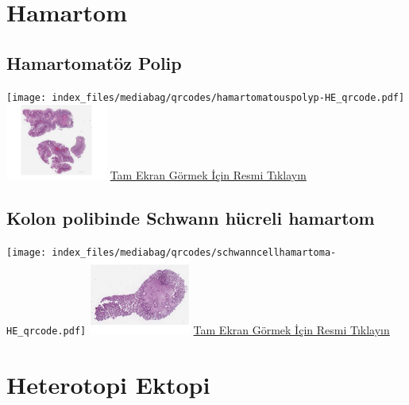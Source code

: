 \documentclass[
  letterpaper,
  DIV=11,
  numbers=noendperiod]{scrreprt}
\begin{document}
\hypertarget{section-11}{%
\chapter{}\label{section-11}}

\hypertarget{sec-hamartom}{%
\chapter{Hamartom}\label{sec-hamartom}}

\hypertarget{sec-hamartomatoz-polip}{%
\section{Hamartomatöz Polip}\label{sec-hamartomatoz-polip}}

\texttt{[image: index\_files/mediabag/qrcodes/hamartomatouspolyp-HE\_qrcode.pdf]}
\href{https://images.patolojiatlasi.com/hamartomatouspolyp/HE.html}{\includegraphics[width=0.25\textwidth,height=\textheight]{./screenshots/thumbnail_hamartomatouspolyp.png}}
\href{https://images.patolojiatlasi.com/hamartomatouspolyp/HE.html}{Tam
Ekran Görmek İçin Resmi Tıklayın}

\hypertarget{sec-schwann-hucreli-hamartom-kolon-polibi}{%
\section{Kolon polibinde Schwann hücreli
hamartom}\label{sec-schwann-hucreli-hamartom-kolon-polibi}}

\texttt{[image: index\_files/mediabag/qrcodes/schwanncellhamartoma-HE\_qrcode.pdf]}
\href{https://images.patolojiatlasi.com/schwanncellhamartoma/HE.html}{\includegraphics[width=0.25\textwidth,height=\textheight]{./screenshots/thumbnail_schwanncellhamartoma.png}}
\href{https://images.patolojiatlasi.com/schwanncellhamartoma/HE.html}{Tam
Ekran Görmek İçin Resmi Tıklayın}

\hypertarget{sec-heterotopi-ektopi}{%
\chapter{Heterotopi Ektopi}\label{sec-heterotopi-ektopi}}
\end{document}
